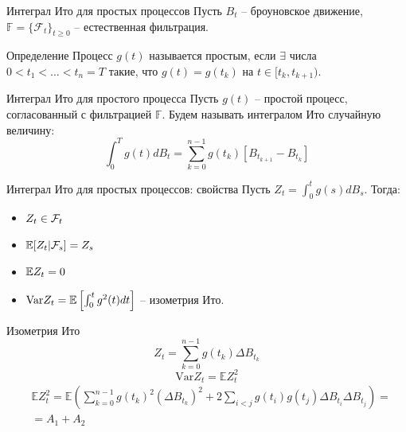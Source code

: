\documentclass[aspectratio=169]{beamer}
\begin{document}
\begin{frame}{Интеграл Ито для простых процессов}
    Пусть $B_t$ -- броуновское движение, $\mathbb{F}=\{\mathcal{F} _t\}_{t\geq 0}$ -- естественная фильтрация.

    \begin{block}{Определение}
        Процесс $g(t)$ называется простым, если $\exists$ числа $0 < t_1 < \ldots < t_n = T$ такие, что $g(t) = g(t_k)$ на $t \in [t_k, t_{k+1})$.
    \end{block}
     
    
    \begin{block}{Интеграл Ито для простого процесса}
        Пусть $g(t)$ -- простой процесс, согласованный с фильтрацией $\mathbb{F}$. Будем называть интегралом Ито случайную величину:
        $$
            \int_0^T g(t) dB_t = \sum_{k=0}^{n-1} g(t_k)\left[B_{t_{k+1}} - B_{t_k}\right]
        $$
    \end{block}    
\end{frame}

\begin{frame}{Интеграл Ито для простых процессов: свойства}
    Пусть $Z_t = \int_0^t g(s) dB_s$. Тогда:
    \begin{itemize}
        \item $Z_t \in \mathcal{F}_t$
        \item $\mathbb{E} [Z_t | \mathcal{F}_s] = Z_s$
        \item $\mathbb{E} Z_t = 0$
        \item $\mathrm{Var} Z_t = \mathbb{E} \left[ \int_0^t g^2(t) dt \right] $ -- изометрия Ито.
    \end{itemize}
\end{frame}

\begin{frame}{Изометрия Ито}
    $$ Z_t = \sum_{k=0}^{n-1} g(t_k) \Delta B_{t_k}$$
    $$\mathrm{Var} Z_t = \mathbb{E} Z_t^2$$
    \begin{align*}
        &\mathbb{E} Z_t^2 = \mathbb{E} \left(\sum_{k=0}^{n-1} g(t_k)^2 \left(\Delta B_{t_k}\right)^2 + 2 \sum_{i < j} g(t_i)g(t_j) \Delta B_{t_i} \Delta B_{t_j}\right) = \\
        &= A_1 + A_2
    \end{align*}
\end{frame}
\end{document}
